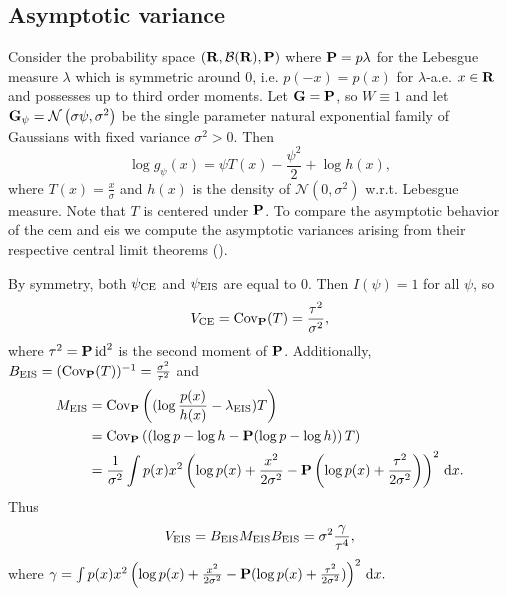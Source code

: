 \subsection{Asymptotic variance}
\begin{example}
    \label{ex:univ-gaussian-s2-fixed}
    Consider the probability space $ \left( \R, \mathcal B(\R), \P \right)$ where $\P = p\lambda$ for the Lebesgue measure $\lambda$ which is symmetric around $0$, i.e. $p(-x) = p(x)$ for $\lambda$-a.e. $x\in\R$ and possesses up to third order moments.
    Let $\G=\P$, so $W\equiv1$ and let $\G_{\psi} = \mathcal N \left( \sigma\psi, \sigma^{2} \right)$ be the single parameter natural exponential family of Gaussians with fixed variance $\sigma^{2} > 0$. Then 
    $$
    \log g_{\psi}(x) = \psi T(x) - \frac{\psi^{2}}{2} + \log h(x),
    $$
    where $T(x) = \frac{x}{\sigma}$ and $h(x)$ is the density of $\mathcal N(0, \sigma^{2})$ w.r.t. Lebesgue measure. 
    Note that $T$ is centered under $\P$. To compare the asymptotic behavior of the \gls{cem} and \gls{eis} we compute the asymptotic variances arising from their respective central limit theorems ().

    By symmetry, both $\pce$ and $\peis$ are equal to $0$. 
    Then $I(\psi) = 1$ for all $\psi$, so 
    \begin{align}
    \label{eq:ce-gaussian-mean-var}
        V_{\ce} = \cov_{\P}(T) = \frac{\tau^{2}}{\sigma^{2}},
    \end{align}
    where $\tau^{2}=\P \operatorname{id}^{2}$ is the second moment of $\P$. 
    Additionally, $B_{\eis} = (\cov_{\P}(T))^{-1} = \frac{\sigma^{2}}{\tau^{2}}$ and
    \begin{align*}
    M_{\eis} &= \cov_{\P} \left( (\log \frac{p(x)}{h(x)} - \lambda_{\eis})T\right) \\
        &= \cov_{\P} \left(\left( \log p - \log h - \P (\log p - \log h) \right) T \right) \\
        &= \frac{1}{\sigma^{2}}\int p(x) x^{2}\left(\log p(x) + \frac{x^{2}}{2\sigma^{2}} - \P\left(\log p(x) + \frac{\tau^{2}}{2\sigma^{2}}\right)\right)^{2} \d x.
    \end{align*}
    Thus
    $$
    V_{\eis} = B_{\eis}M_{\eis}B_{\eis}= \sigma^{2}\frac{\gamma}{\tau^{4}},
    $$
    where $\gamma = \int p(x) x^{2}\left(\log p(x) + \frac{x^{2}}{2\sigma^{2}} - \P(\log p(x) + \frac{\tau^{2}}{2\sigma^{2}})\right)^{2} \d x.$
    

\end{example}
